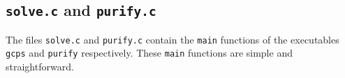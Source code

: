 \documentclass[12pt]{article}
\theoremstyle{definition}
\begin{document}
\begin{appendix}
\subsection{\texttt{solve.c} and  \texttt{purify.c}}

The files \texttt{solve.c} and \texttt{purify.c} contain the
\texttt{main} functions of the executables \texttt{gcps} and
\texttt{purify} respectively.  These \texttt{main} functions are
simple and straightforward.

\end{appendix}
\end{document}
